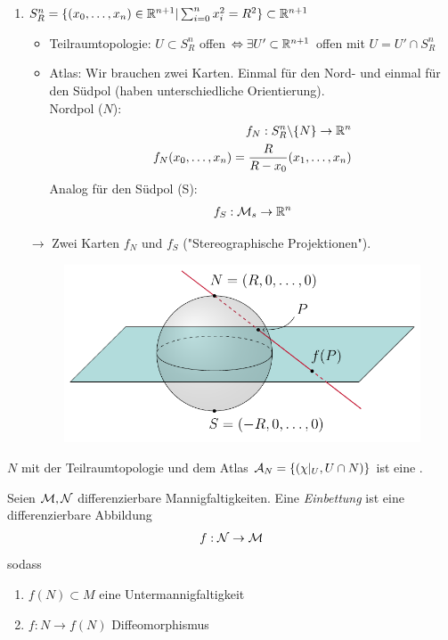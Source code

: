 \begin{bsp}
\begin{enumerate}
\item $S_R^n = \{ (x_0, \dots, x_n) \in \mathbb{R}^{n+1} \vert \sum_{i=0}^n x_i^2 = R^2 \} \subset \mathbb{R}^{n+1}$

\begin{itemize}
\item Teilraumtopologie: $U \subset S^n_R$ offen $\Leftrightarrow \exists U' \subset \mathbb{R}^{n+1}$ offen mit $U = U' \cap S^n_R$
\item Atlas: Wir brauchen zwei Karten. 
Einmal für den Nord- und einmal für den Südpol (haben unterschiedliche Orientierung).  \\
Nordpol ($N$):
\begin{align}
f_N : S^n_R \backslash \{ N \} \to \mathbb{R}^n \\
f_N (x_0, \dots , x_n) = \frac{R}{R- x_0} (x_1, \dots, x_n) 
\end{align}
Analog für den Südpol (S):
\begin{align}
f_S : \mathcal{M}_s \to \mathbb{R}^n
\end{align}
\end{itemize}
$\to$ Zwei Karten $f_N$ und $f_S$ ("Stereographische Projektionen").
\begin{figure}[H]
\centering
\includegraphics[scale=0.8]{figures/tikz/stereographic_projection.pdf}
\end{figure}
\end{enumerate}
\end{bsp}

\begin{bem}
$N$ mit der Teilraumtopologie und dem Atlas $\mathcal{A}_N = \left\{(\chi\vert_U, U\cap N)\right\}$ ist eine \difM.
\end{bem}

\begin{defs}
Seien $\mathcal{M}, \mathcal{N}$ differenzierbare Mannigfaltigkeiten. Eine \textit{Einbettung} ist eine differenzierbare Abbildung
\begin{align*}
f: \mathcal{N} \rightarrow \mathcal{M}
\end{align*}
sodass
\begin{enumerate}
\item$f(N)\subset M$ eine Untermannigfaltigkeit 
\item$f: N \rightarrow f(N)$ Diffeomorphismus
\end{enumerate}
\end{defs}

